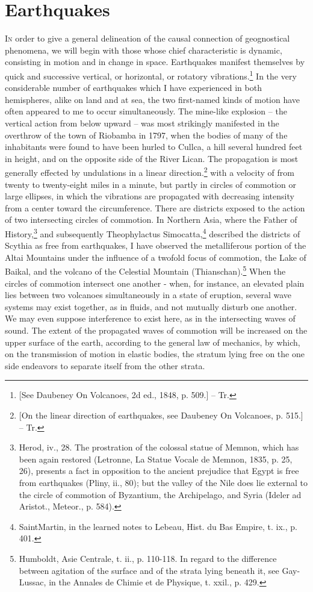 \chapter{Earthquakes}
    
\lettrine[lines=4]{\goudy I}{n} order to give a general delineation of the causal connection of geognostical phenomena, we will begin with those whose chief characteristic is dynamic, consisting in motion and in change in space. Earthquakes manifest themselves by quick and successive vertical, or horizontal, or rotatory vibrations.\footnote{[See Daubeney On Volcanoes, 2d ed., 1848, p. 509.] -- Tr.} In the very considerable number of earthquakes which I have experienced in both hemispheres, alike on land and at sea, the two first-named kinds of motion have often appeared to me to occur simultaneously. The mine-like explosion -- the vertical action from below upward -- was most strikingly manifested in the overthrow of the town of Riobamba in 1797, when the bodies of many of the inhabitants were found to have been hurled to Cullca, a hill several hundred feet in height, and on the opposite side of the River Lican. The propagation is most generally effected by undulations in a linear direction.\footnote{[On the linear direction of earthquakes, see Daubeney On Volcanoes, p. 515.] -- Tr.} with a velocity of from twenty to twenty-eight miles in a minute, but partly in circles of commotion or large ellipses, in which the vibrations are propagated with decreasing intensity from a center toward the circumference. There are districts exposed to the action of two intersecting circles of commotion. In Northern Asia, where the Father of History,\footnote{Herod, iv., 28. The prostration of the colossal statue of Memnon, which has been again restored (Letronne, La Statue Vocale de Memnon, 1835, p. 25, 26), presents a fact in opposition to the ancient prejudice that Egypt is free from earthquakes (Pliny, ii., 80); but the valley of the Nile does lie external to the circle of commotion of Byzantium, the Archipelago, and Syria (Ideler ad Aristot., Meteor., p. 584).} and subsequently Theophylactus Simocatta,\footnote{SaintMartin, in the learned notes to Lebeau, Hist. du Bas Empire, t. ix., p. 401.} described the districts of Scythia as free from earthquakes, I have observed the metalliferous portion of the Altai Mountains under the influence of a twofold focus of commotion, the Lake of Baikal, and the volcano of the Celestial Mountain (Thianschan).\footnote{Humboldt, Asie Centrale, t. ii., p. 110-118. In regard to the difference between agitation of the surface and of the strata lying beneath it, see Gay-Lussac, in the Annales de Chimie et de Physique, t. xxil., p. 429.} When the circles of commotion intersect one another - when, for instance, an elevated plain lies between two volcanoes simultaneously in a state of eruption, several wave systems may exist together, as in fluids, and not mutually disturb one another. We may even suppose interference to exist here, as in the intersecting waves of sound. The extent of the propagated waves of commotion will be increased on the upper surface of the earth, according to the general law of mechanics, by which, on the transmission of motion in elastic bodies, the stratum lying free on the one side endeavors to separate itself from the other strata.

